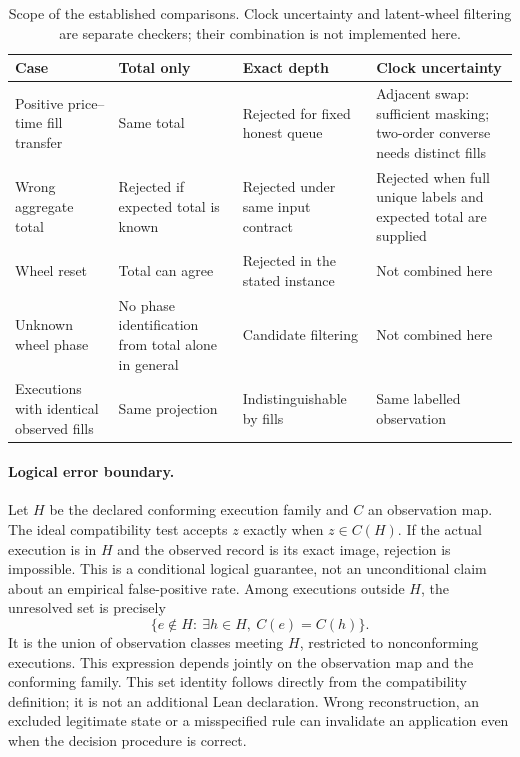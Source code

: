 \documentclass[11pt]{article}
\theoremstyle{definition}
\theoremstyle{remark}
\begin{document}
\begin{table}[tb]
\centering
\caption{Scope of the established comparisons. Clock uncertainty and latent-wheel filtering are separate checkers; their combination is not implemented here.}\label{tab:id}
\small
\begin{tabular}{@{}P{.23\linewidth}P{.20\linewidth}P{.24\linewidth}P{.25\linewidth}@{}}
\toprule
Case & Total only & Exact depth & Clock uncertainty\\
\midrule
Positive price--time fill transfer & Same total & Rejected for fixed honest queue & Adjacent swap: sufficient masking; two-order converse needs distinct fills\\[4pt]
Wrong aggregate total & Rejected if expected total is known & Rejected under same input contract & Rejected when full unique labels and expected total are supplied\\[4pt]
Wheel reset & Total can agree & Rejected in the stated instance & Not combined here\\[4pt]
Unknown wheel phase & No phase identification from total alone in general & Candidate filtering & Not combined here\\[4pt]
Executions with identical observed fills & Same projection & Indistinguishable by fills & Same labelled observation\\
\bottomrule
\end{tabular}
\end{table}

\paragraph{Logical error boundary.} Let $H$ be the declared conforming execution family and $C$ an observation map. The ideal compatibility test accepts $z$ exactly when $z\in C(H)$. If the actual execution is in $H$ and the observed record is its exact image, rejection is impossible. This is a conditional logical guarantee, not an unconditional claim about an empirical false-positive rate. Among executions outside $H$, the unresolved set is precisely
\[
\{e\notin H:\ \exists h\in H,\ C(e)=C(h)\}.
\]
It is the union of observation classes meeting $H$, restricted to nonconforming executions. This expression depends jointly on the observation map and the conforming family. This set identity follows directly from the compatibility definition; it is not an additional Lean declaration. Wrong reconstruction, an excluded legitimate state or a misspecified rule can invalidate an application even when the decision procedure is correct.
\end{document}
